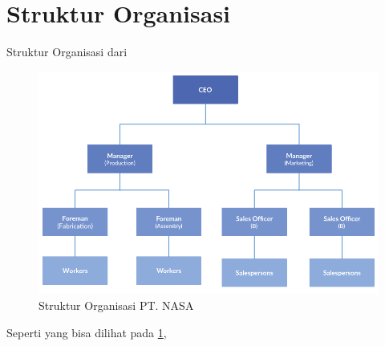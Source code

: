 \section{Struktur Organisasi}
\vspace{1ex}

Struktur Organisasi dari \lipsum[1]
\vspace{0.5ex}

\begin{figure} [ht] \centering
  \includegraphics[scale=0.45]{gambar/struktur-organisasi.png}
  \caption{Struktur Organisasi PT. NASA}
	\label{fig:strukturOrganisasi}
\end{figure}

Seperti yang bisa dilihat pada \ref{fig:strukturOrganisasi}, \lipsum[1]
\vspace{0.5ex}

